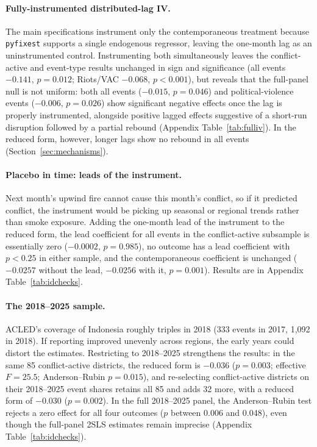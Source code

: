 \documentclass[12pt]{article}
\begin{document}
\paragraph{Fully-instrumented distributed-lag IV.} The main specifications instrument only the contemporaneous treatment because \texttt{pyfixest} supports a single endogenous regressor, leaving the one-month lag as an uninstrumented control. Instrumenting both simultaneously leaves the conflict-active and event-type results unchanged in sign and significance (all events $-0.141$, $p=0.012$; Riots/VAC $-0.068$, $p<0.001$), but reveals that the full-panel null is not uniform: both all events ($-0.015$, $p=0.046$) and political-violence events ($-0.006$, $p=0.026$) show significant negative effects once the lag is properly instrumented, alongside positive lagged effects suggestive of a short-run disruption followed by a partial rebound (Appendix Table~\ref{tab:fulliv}). In the reduced form, however, longer lags show no rebound in all events (Section~\ref{sec:mechanisms}).


\paragraph{Placebo in time: leads of the instrument.} Next month's upwind fire cannot cause this month's conflict, so if it predicted conflict, the instrument would be picking up seasonal or regional trends rather than smoke exposure. Adding the one-month lead of the instrument to the reduced form, the lead coefficient for all events in the conflict-active subsample is essentially zero ($-0.0002$, $p=0.985$), no outcome has a lead coefficient with $p<0.25$ in either sample, and the contemporaneous coefficient is unchanged ($-0.0257$ without the lead, $-0.0256$ with it, $p=0.001$). Results are in Appendix Table~\ref{tab:idchecks}.

\paragraph{The 2018--2025 sample.} ACLED's coverage of Indonesia roughly triples in 2018 (333 events in 2017, 1,092 in 2018). If reporting improved unevenly across regions, the early years could distort the estimates. Restricting to 2018--2025 strengthens the results: in the same 85 conflict-active districts, the reduced form is $-0.036$ ($p=0.003$; effective $F = 25.5$; Anderson--Rubin $p=0.015$), and re-selecting conflict-active districts on their 2018--2025 event shares retains all 85 and adds 32 more, with a reduced form of $-0.030$ ($p=0.002$). In the full 2018--2025 panel, the Anderson--Rubin test rejects a zero effect for all four outcomes ($p$ between 0.006 and 0.048), even though the full-panel 2SLS estimates remain imprecise (Appendix Table~\ref{tab:idchecks}).
\end{document}
